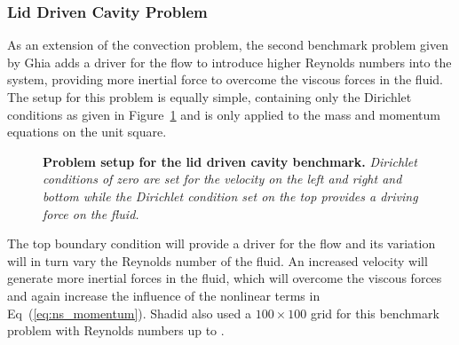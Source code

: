 \subsubsection{Lid Driven Cavity Problem}
\label{subsubsec:lid_driven_cavity}
As an extension of the convection problem, the second benchmark
problem given by Ghia \citep{ghia_high-re_1982} adds a driver for the
flow to introduce higher Reynolds numbers into the system, providing
more inertial force to overcome the viscous forces in the fluid. The
setup for this problem is equally simple, containing only the
Dirichlet conditions as given in Figure~\ref{fig:lid_driven_cavity}
and is only applied to the mass and momentum equations on the unit
square.
\begin{figure}[htpb!]
  \begin{center}
    \scalebox{1.5}{
       }
  \end{center}
  \caption{\textbf{Problem setup for the lid driven cavity benchmark.}
    \textit{Dirichlet conditions of zero are set for the velocity on
      the left and right and bottom while the Dirichlet condition set
      on the top provides a driving force on the fluid.}}
  \label{fig:lid_driven_cavity}
\end{figure}
The top boundary condition will provide a driver for the flow and its
variation will in turn vary the Reynolds number of the fluid. An
increased velocity will generate more inertial forces in the fluid,
which will overcome the viscous forces and again increase the
influence of the nonlinear terms in Eq~(\ref{eq:ns_momentum}). Shadid
also used a $100 \times 100$ grid for this benchmark problem with
Reynolds numbers up to .


